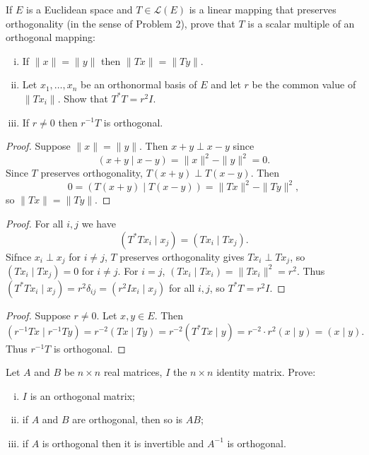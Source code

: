 \begin{tcolorbox}[title=Problem 3, breakable]
If $E$ is a Euclidean space and $T \in \mathcal{L}(E)$ 
is a linear mapping that preserves orthogonality (in the sense of Problem 2), 
prove that $T$ is a scalar multiple of an orthogonal mapping:
\begin{enumerate}[(i)]
    \item If $\|x\| = \|y\|$ then $\|Tx\| = \|Ty\|$.
    \item Let $x_1, \ldots, x_n$ be an orthonormal basis of $E$ 
    and let $r$ be the common value of $\|Tx_i\|$. Show that $T^*T = r^2 I$.
    \item If $r \neq 0$ then $r^{-1}T$ is orthogonal.
\end{enumerate}
\end{tcolorbox}

\begin{proof}
    Suppose $\|x\| = \|y\|$.
    Then $x + y \perp x - y$ since
    \[(x+y \mid x-y) = \|x\|^2 - \|y\|^2 = 0.\]
    Since $T$ preserves orthogonality, $T(x+y) \perp T(x-y)$. Then
    \[0 = (T(x+y) \mid T(x-y)) = \|Tx\|^2 - \|Ty\|^2,\]
    so $\|Tx\| = \|Ty\|$.
\end{proof}

\begin{proof}
    For all $i, j$ we have
    \[(T^* Tx_i \mid x_j) = (Tx_i \mid Tx_j).\]
    Sifnce $x_i \perp x_j$ for $i \ne j$, $T$ preserves orthogonality gives $Tx_i \perp Tx_j$,
    so $(Tx_i \mid Tx_j) = 0$ for $i \ne j$.
    For $i = j$, $(Tx_i \mid Tx_i) = \|Tx_i\|^2 = r^2$.
    Thus $(T^*T x_i \mid x_j) = r^2 \delta_{ij} = (r^2 I x_i \mid x_j)$
    for all $i, j$, so $T^*T = r^2 I$.
\end{proof}

\begin{proof}
    Suppose $r \ne 0$.
    Let $x, y \in E$. Then
    \[(r^{-1} Tx \mid r^{-1} Ty) = r^{-2}(Tx \mid Ty) = r^{-2}(T^*Tx \mid y) = r^{-2} \cdot r^2(x \mid y) = (x \mid y).\]
    Thus $r^{-1} T$ is orthogonal.
\end{proof}

\begin{tcolorbox}[title=Problem 4, breakable]
Let $A$ and $B$ be $n \times n$ real matrices, $I$ the $n \times n$ identity matrix. Prove:
\begin{enumerate}[(i)]
    \item $I$ is an orthogonal matrix;
    \item if $A$ and $B$ are orthogonal, then so is $AB$;
    \item if $A$ is orthogonal then it is invertible and $A^{-1}$ is orthogonal.
\end{enumerate}
\end{tcolorbox}

